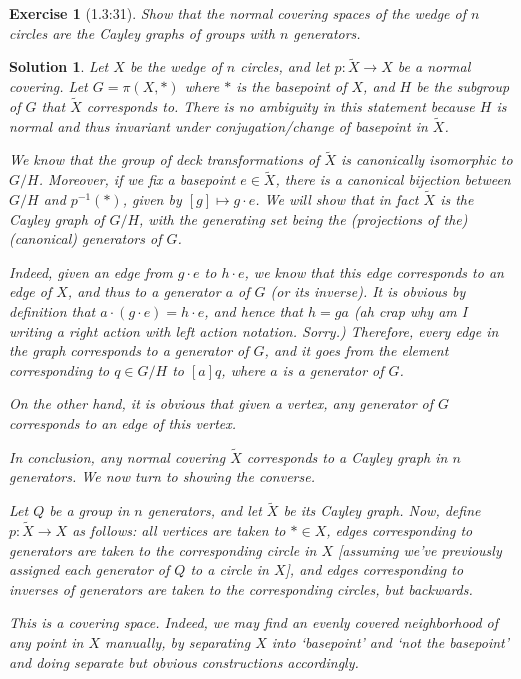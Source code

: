 \documentclass{article}
\theoremstyle{plain}
\newtheorem*{ex}{Exercise}
\theoremstyle{nonumberplain}
\newtheorem{sol}{Solution}
\begin{document}
\begin{ex}[1.3:31]
Show that the normal covering spaces of the wedge of $n$ circles are the Cayley graphs of groups with $n$ generators.
\end{ex}

\begin{sol}
Let $X$ be the wedge of $n$ circles, and let $p \colon \tilde X \to X$ be a normal covering. Let $G = \pi(X, *)$ where $*$ is the basepoint of $X$, and $H$ be the subgroup of $G$ that $\tilde X$ corresponds to. There is no ambiguity in this statement because $H$ is normal and thus invariant under conjugation/change of basepoint in $\tilde X$.

We know that the group of deck transformations of $\tilde X$ is canonically isomorphic to $G / H$. Moreover, if we fix a basepoint $e \in \tilde X$, there is a canonical bijection between $G/H$ and $p^{-1}(*)$, given by $[g] \mapsto g \cdot e$. We will show that in fact $\tilde X$ is the Cayley graph of $G/H$, with the generating set being the (projections of the) (canonical) generators of $G$.

Indeed, given an edge from $g \cdot e$ to $h \cdot e$, we know that this edge corresponds to an edge of $X$, and thus to a generator $a$ of $G$ (or its inverse). It is obvious by definition that $a \cdot (g \cdot e) = h \cdot e$, and hence that $h = ga$ (ah crap why am I writing a right action with left action notation. Sorry.) Therefore, \emph{every edge in the graph corresponds to a generator of $G$, and it goes from the element corresponding to $q \in G/H$ to $[a] q$}, where $a$ is a generator of $G$.

On the other hand, it is obvious that given a vertex, any generator of $G$ corresponds to an edge of this vertex.

In conclusion, any normal covering $\tilde X$ corresponds to a Cayley graph in $n$ generators. We now turn to showing the converse.

\smallskip

Let $Q$ be a group in $n$ generators, and let $\tilde X$ be its Cayley graph. Now, define $p \colon \tilde X \to X$ as follows: all vertices are taken to $* \in X$, edges corresponding to generators are taken to the corresponding circle in $X$ [assuming we've previously assigned each generator of $Q$ to a circle in $X$], and edges corresponding to inverses of generators are taken to the corresponding circles, but backwards.

This is a covering space. Indeed, we may find an evenly covered neighborhood of any point in $X$ manually, by separating $X$ into `basepoint' and `not the basepoint' and doing separate but obvious constructions accordingly.


\end{sol}
\end{document}
